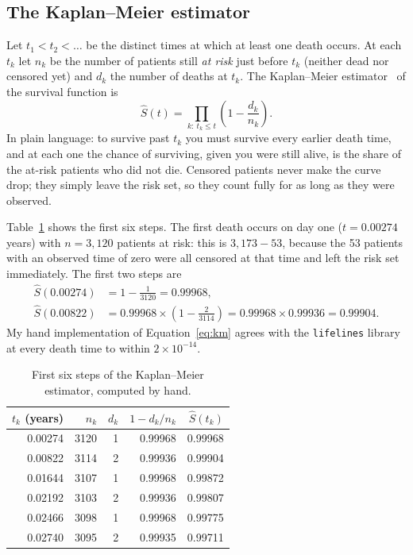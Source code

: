 \documentclass[11pt,a4paper]{article}
\begin{document}
\subsection{The Kaplan--Meier estimator}
Let $t_1 < t_2 < \dots$ be the distinct times at which at least one death occurs. At
each $t_k$ let $n_k$ be the number of patients still \emph{at risk} just before $t_k$
(neither dead nor censored yet) and $d_k$ the number of deaths at $t_k$. The
Kaplan--Meier estimator~\cite{kaplan1958} of the survival function is
\begin{equation}
\hat S(t) = \prod_{k:\ t_k \le t} \left(1 - \frac{d_k}{n_k}\right).
\label{eq:km}
\end{equation}
In plain language: to survive past $t_k$ you must survive every earlier death time,
and at each one the chance of surviving, given you were still alive, is the share of
the at-risk patients who did not die. Censored patients never make the curve drop;
they simply leave the risk set, so they count fully for as long as they were observed.

Table~\ref{tab:kmsteps} shows the first six steps. The first death occurs on day one
($t = 0.00274$ years) with $n = 3{,}120$ patients at risk: this is $3{,}173 - 53$, because
the 53 patients with an observed time of zero were all censored at that time and left
the risk set immediately. The first two steps are
\begin{align*}
\hat S(0.00274) &= 1 - \tfrac{1}{3120} = 0.99968,\\
\hat S(0.00822) &= 0.99968 \times \left(1 - \tfrac{2}{3114}\right)
                 = 0.99968 \times 0.99936 = 0.99904.
\end{align*}
My hand implementation of Equation~\eqref{eq:km} agrees with the \texttt{lifelines}
library~\cite{lifelines2019} at every death time to within $2\times 10^{-14}$.

\begin{table}[H]
\centering
\caption{First six steps of the Kaplan--Meier estimator, computed by hand.}
\label{tab:kmsteps}
\begin{tabular}{rrrrr}
\toprule
$t_k$ (years) & $n_k$ & $d_k$ & $1 - d_k/n_k$ & $\hat S(t_k)$ \\
\midrule
0.00274 & 3120 & 1 & 0.99968 & 0.99968 \\
0.00822 & 3114 & 2 & 0.99936 & 0.99904 \\
0.01644 & 3107 & 1 & 0.99968 & 0.99872 \\
0.02192 & 3103 & 2 & 0.99936 & 0.99807 \\
0.02466 & 3098 & 1 & 0.99968 & 0.99775 \\
0.02740 & 3095 & 2 & 0.99935 & 0.99711 \\
\bottomrule
\end{tabular}
\end{table}
\end{document}
